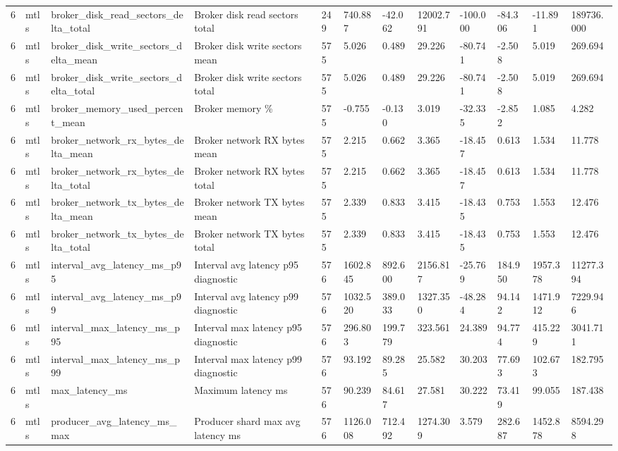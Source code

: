 \begin{longtable}{llllllllllll}
6 & mtls & broker\_disk\_read\_sectors\_delta\_total & Broker disk read sectors total & 249 & 740.887 & -42.062 & 12002.791 & -100.000 & -84.306 & -11.891 & 189736.000 \\
6 & mtls & broker\_disk\_write\_sectors\_delta\_mean & Broker disk write sectors mean & 575 & 5.026 & 0.489 & 29.226 & -80.741 & -2.508 & 5.019 & 269.694 \\
6 & mtls & broker\_disk\_write\_sectors\_delta\_total & Broker disk write sectors total & 575 & 5.026 & 0.489 & 29.226 & -80.741 & -2.508 & 5.019 & 269.694 \\
6 & mtls & broker\_memory\_used\_percent\_mean & Broker memory \% & 575 & -0.755 & -0.130 & 3.019 & -32.335 & -2.852 & 1.085 & 4.282 \\
6 & mtls & broker\_network\_rx\_bytes\_delta\_mean & Broker network RX bytes mean & 575 & 2.215 & 0.662 & 3.365 & -18.457 & 0.613 & 1.534 & 11.778 \\
6 & mtls & broker\_network\_rx\_bytes\_delta\_total & Broker network RX bytes total & 575 & 2.215 & 0.662 & 3.365 & -18.457 & 0.613 & 1.534 & 11.778 \\
6 & mtls & broker\_network\_tx\_bytes\_delta\_mean & Broker network TX bytes mean & 575 & 2.339 & 0.833 & 3.415 & -18.435 & 0.753 & 1.553 & 12.476 \\
6 & mtls & broker\_network\_tx\_bytes\_delta\_total & Broker network TX bytes total & 575 & 2.339 & 0.833 & 3.415 & -18.435 & 0.753 & 1.553 & 12.476 \\
6 & mtls & interval\_avg\_latency\_ms\_p95 & Interval avg latency p95 diagnostic & 576 & 1602.845 & 892.600 & 2156.817 & -25.769 & 184.950 & 1957.378 & 11277.394 \\
6 & mtls & interval\_avg\_latency\_ms\_p99 & Interval avg latency p99 diagnostic & 576 & 1032.520 & 389.033 & 1327.350 & -48.284 & 94.142 & 1471.912 & 7229.946 \\
6 & mtls & interval\_max\_latency\_ms\_p95 & Interval max latency p95 diagnostic & 576 & 296.803 & 199.779 & 323.561 & 24.389 & 94.774 & 415.229 & 3041.711 \\
6 & mtls & interval\_max\_latency\_ms\_p99 & Interval max latency p99 diagnostic & 576 & 93.192 & 89.285 & 25.582 & 30.203 & 77.693 & 102.673 & 182.795 \\
6 & mtls & max\_latency\_ms & Maximum latency ms & 576 & 90.239 & 84.617 & 27.581 & 30.222 & 73.419 & 99.055 & 187.438 \\
6 & mtls & producer\_avg\_latency\_ms\_max & Producer shard max avg latency ms & 576 & 1126.008 & 712.492 & 1274.309 & 3.579 & 282.687 & 1452.878 & 8594.298 \\

\end{longtable}
